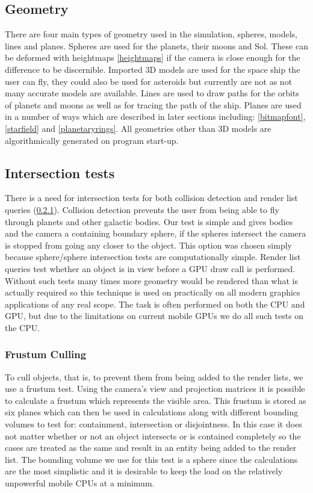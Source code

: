 \subsection{Geometry}

There are four main types of geometry used in the simulation, spheres, models, lines and planes. Spheres are used for the planets, their moons and Sol. These can be deformed with heightmaps \cref{heightmaps} if the camera is close enough for the difference to be discernible. Imported 3D models are used for the space ship the user can fly, they could also be used for asteroids but currently are not as not many accurate models are available. Lines are used to draw paths for the orbits of planets and moons as well as for tracing the path of the ship. Planes are used in a number of ways which are described in later sections including: \cref{bitmapfont}, \cref{starfield} and \cref{planetaryrings}. All geometries other than 3D models are algorithmically generated on program start-up.

\subsection{Intersection tests}

There is a need for intersection tests for both collision detection and render list queries (\cref{culling}). Collision detection prevents the user from being able to fly through planets and other galactic bodies. Our test is simple and gives bodies and the camera a containing boundary sphere, if the spheres intersect the camera is stopped from going any closer to the object. This option was chosen simply because sphere/sphere intersection tests are computationally simple. Render list queries test whether an object is in view before a GPU draw call is performed. Without such tests many times more geometry would be rendered than what is actually required so this technique is used on practically on all modern graphics applications of any real scope. The task is often performed on both the CPU and GPU, but due to the limitations on current mobile GPUs we do all such tests on the CPU.

\subsubsection{Frustum Culling}
\label{culling}

To cull objects, that is, to prevent them from being added to the render lists, we use a frustum test. Using the camera's view and projection matrices it is possible to calculate a frustum which represents the visible area. This frustum is stored as six planes which can then be used in calculations along with different bounding volumes to test for: containment, intersection or disjointness. In this case it does not matter whether or not an object intersects or is contained completely so the cases are treated as the same and result in an entity being added to the render list. The bounding volume we use for this test is a sphere since the calculations are the most simplistic and it is desirable to keep the load on the relatively unpowerful mobile CPUs at a minimum. 

